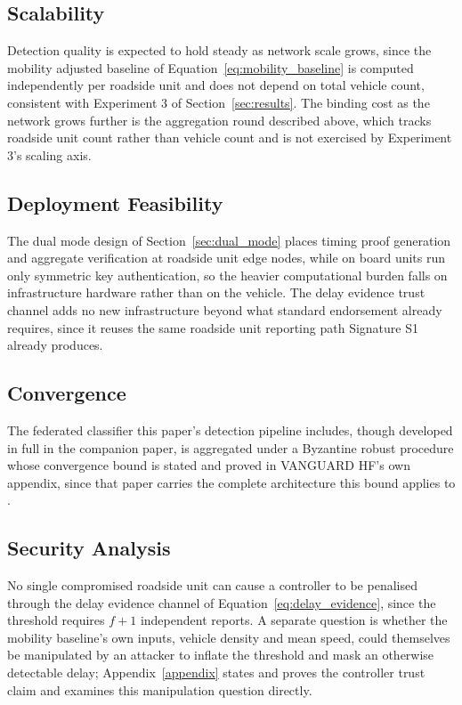 \documentclass[final,5p,twocolumn]{elsarticle}
\theoremstyle{remark}
\theoremstyle{plain}
\begin{document}
\subsection{Scalability}
Detection quality is expected to hold steady as network scale grows, since
the mobility adjusted baseline of Equation~\eqref{eq:mobility_baseline} is
computed independently per roadside unit and does not depend on total
vehicle count, consistent with Experiment 3 of Section~\ref{sec:results}.
The binding cost as the network grows further is the aggregation round
described above, which tracks roadside unit count rather than vehicle
count and is not exercised by Experiment 3's scaling axis.

\subsection{Deployment Feasibility}
The dual mode design of Section~\ref{sec:dual_mode} places timing proof
generation and aggregate verification at roadside unit edge nodes, while on
board units run only symmetric key authentication, so the heavier
computational burden falls on infrastructure hardware rather than on the
vehicle. The delay evidence trust channel adds no new infrastructure beyond
what standard endorsement already requires, since it reuses the same
roadside unit reporting path Signature S1 already produces.

\subsection{Convergence}
The federated classifier this paper's detection pipeline includes, though
developed in full in the companion paper, is aggregated under a Byzantine
robust procedure whose convergence bound is stated and proved in
VANGUARD HF's own appendix, since that paper carries the complete
architecture this bound applies to \cite{VanguardHF2026}.

\subsection{Security Analysis}
No single compromised roadside unit can cause a controller to be penalised
through the delay evidence channel of Equation~\eqref{eq:delay_evidence},
since the threshold requires $f{+}1$ independent reports. A separate
question is whether the mobility baseline's own inputs, vehicle density and
mean speed, could themselves be manipulated by an attacker to inflate the
threshold and mask an otherwise detectable delay; Appendix~\ref{appendix}
states and proves the controller trust claim and examines this
manipulation question directly.
\end{document}
